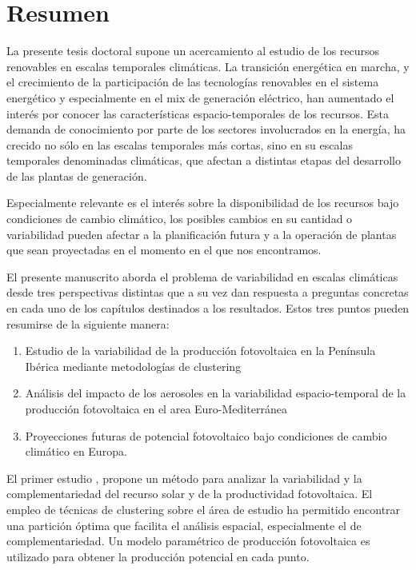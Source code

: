 \chapter*{Resumen\label{cha:resumen}}

La presente tesis doctoral supone un acercamiento al estudio de los recursos renovables en escalas temporales climáticas. La transición energética en marcha, y el crecimiento de la participación de las tecnologías renovables en el sistema energético y especialmente en el mix de generación eléctrico, han aumentado el interés por conocer las características espacio-temporales de los recursos. Esta demanda de conocimiento por parte de los sectores involucrados en la energía, ha crecido no sólo en las escalas temporales más cortas, sino en su escalas temporales denominadas climáticas, que afectan a distintas etapas del desarrollo de las plantas de generación.

Especialmente relevante es el interés sobre la disponibilidad de los recursos bajo condiciones de cambio climático, los posibles cambios en su cantidad o variabilidad pueden afectar a la planificación futura y a la operación de plantas que sean proyectadas en el momento en el que nos encontramos.

El presente manuscrito aborda el problema de variabilidad en escalas climáticas desde tres perspectivas distintas que a su vez dan respuesta a preguntas concretas en cada uno de los capítulos destinados a los resultados. Estos tres puntos pueden resumirse de la siguiente manera:

\begin{enumerate}
\item Estudio de la variabilidad de la producción fotovoltaica en la Península Ibérica mediante metodologías de clustering
\item Análisis del impacto de los aerosoles en la variabilidad espacio-temporal de la producción fotovoltaica en el area Euro-Mediterránea
\item Proyecciones futuras de potencial fotovoltaico bajo condiciones de cambio climático en Europa.
\end{enumerate}

El primer estudio \cite*{Gutierrez2017}, propone un método para analizar la variabilidad y la complementariedad del recurso solar y de la productividad fotovoltaica. El empleo de técnicas de clustering sobre el área de estudio ha permitido encontrar una partición óptima que facilita el análisis espacial, especialmente el de complementariedad. Un modelo paramétrico de producción fotovoltaica es utilizado para obtener la producción potencial en cada punto.

